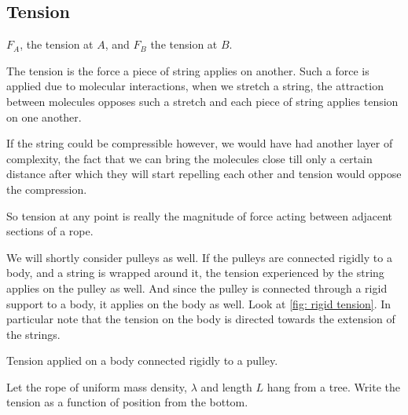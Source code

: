 \subsection{Tension}

\begin{marginfigure}
    \caption{\(F_A\), the tension at \(A\), and \(F_B\) the tension at \(B\).}
\end{marginfigure}

The tension is the force a piece of string applies on another. Such a force 
is applied due to molecular interactions, when we stretch a string, the attraction 
between molecules opposes such a stretch and each piece of string applies tension on one another.

If the string could be compressible however, we would have had another layer of complexity,
the fact that we can bring the molecules close till only a certain distance after which 
they will start repelling each other and tension would oppose the compression.

So tension at any point is really the magnitude of force acting between adjacent sections of a rope.

We will shortly consider pulleys as well. If the pulleys are connected rigidly to 
a body, and a string is wrapped around it, the tension experienced by the string applies on the 
pulley as well. And since the pulley is connected through a rigid support to a body, 
it applies on the body as well. Look at \cref{fig: rigid tension}. In particular note that 
the tension on the body is directed towards the extension of the strings.

\begin{marginfigure}
    \caption{Tension applied on a body connected rigidly to a pulley.}
    \label{fig: rigid tension}
\end{marginfigure}

\begin{example}
    Let the rope of uniform mass density, \(\lambda\) and length \(L\) hang from a tree. Write the tension as 
    a function of position from the bottom. 
\end{example}

